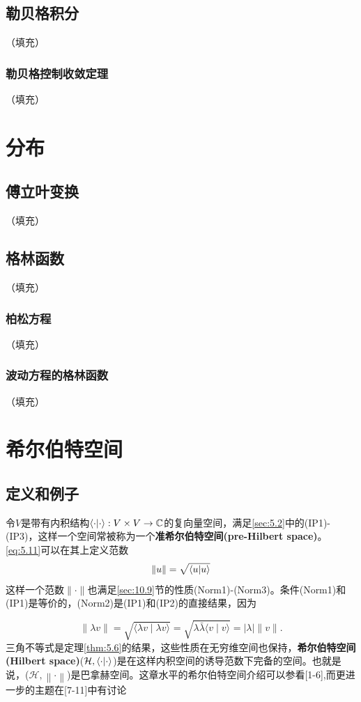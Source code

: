 \documentclass[hyperref,UTF8]{ctexbook}
\begin{document}
\section{勒贝格积分}（填充）
\subsection{勒贝格控制收敛定理}（填充）
\chapter{分布}


\section{傅立叶变换}（填充）
\section{格林函数}（填充）
\subsection{柏松方程}（填充）
\subsection{波动方程的格林函数}（填充）
\chapter{希尔伯特空间}
\section{定义和例子}
令$V$是带有内积结构\(\braket{\cdot|\cdot}:V\times V\rightarrow\mathbb{C}\)的复向量空间，满足\ref{sec:5.2}中的(IP1)-(IP3)，这样一个空间常被称为一个\textbf{准希尔伯特空间(pre-Hilbert space)}。\ref*{eq:5.11}可以在其上定义范数
\[\left\lVert u\right\rVert =\sqrt{\braket{u|u}}\]
这样一个范数\(\lVert \cdot\rVert \)也满足\ref{sec:10.9}节的性质(Norm1)-(Norm3)。条件(Norm1)和(IP1)是等价的，(Norm2)是(IP1)和(IP2)的直接结果，因为

\begin{equation}
    \|\lambda v\|=\sqrt{\langle\lambda v \mid \lambda v\rangle}=\sqrt{\lambda \bar{\lambda}\langle v \mid v\rangle}=|\lambda|\|v\| .
\end{equation}
三角不等式是定理\ref{thm:5.6}的结果，这些性质在无穷维空间也保持，\textbf{希尔伯特空间(Hilbert space)}(\(\mathcal{H},\braket{\cdot|\cdot}\))是在这样内积空间的诱导范数下完备的空间。也就是说，(\(\mathcal{H},\left\lVert \cdot\right\rVert \))是巴拿赫空间。这章水平的希尔伯特空间介绍可以参看[1-6],而更进一步的主题在[7-11]中有讨论
\end{document}

